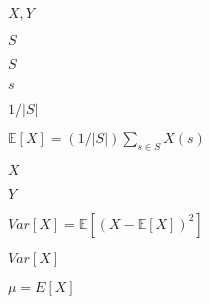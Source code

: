 \documentclass[10pt]{book}
\begin{document}
\begin{mdSnippets}
\newcommand{\zo}{\{0,1\}}
\newcommand{\getsr}{\leftarrow_{\text{\tiny R}}}
\newcommand{\E}{\mathbb{E}}

\begin{mdInlineSnippet}[d23a4ce8bca0f4891e037439a79b45a6]%
$X,Y$\end{mdInlineSnippet}%
\begin{mdInlineSnippet}%
$S$\end{mdInlineSnippet}%
\begin{mdInlineSnippet}%
$S$\end{mdInlineSnippet}%
\begin{mdInlineSnippet}[03c7c0ace395d80182db07ae2c30f034]%
$s$\end{mdInlineSnippet}%
\begin{mdInlineSnippet}[182757df1823f939b96d7a2a9d6a2e50]%
$1/|S|$\end{mdInlineSnippet}%
\begin{mdInlineSnippet}%
$\E[X]= (1/|S|)\sum_{s\in S}X(s)$\end{mdInlineSnippet}%
\begin{mdInlineSnippet}[02129bb861061d1a052c592e2dc6b383]%
$X$\end{mdInlineSnippet}%
\begin{mdInlineSnippet}[57cec4137b614c87cb4e24a3d003a3e0]%
$Y$\end{mdInlineSnippet}%
\begin{mdInlineSnippet}[e0ea647cfe1e76b41c13c0da34ea3cc3]%
$Var[X] = \E [ (X-\E[X])^2 ]$\end{mdInlineSnippet}%
\begin{mdInlineSnippet}%
$Var[X]$\end{mdInlineSnippet}%
\begin{mdInlineSnippet}%
$\mu = E[X]$\end{mdInlineSnippet}%
\begin{mdDisplaySnippet}%
\[%
\begin{aligned} 

\end{aligned}\]
\end{mdDisplaySnippet}
\end{mdSnippets}
\end{document}
